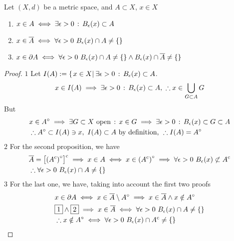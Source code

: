 \documentclass[../complete.tex]{subfiles}
\begin{document}
\begin{prop}
	Let $(X,d)$ be a metric space, and $A\subset X$, $x\in X$
	\begin{enumerate}
	\item $x\in A\iff\exists\epsilon>0\, :\,  B_\epsilon(x)\subset A$
	\item $x\in\cc{A}\iff\forall\epsilon>0\ B_\epsilon(x)\cap A\ne\{\}$
	\item $x\in\partial A\iff\forall\epsilon>0\ B_\epsilon(x)\cap A\ne\{\}\wedge B_\epsilon(x)\cap\overline{A}\ne\{\}$
	\end{enumerate}
\end{prop}
\begin{proof}
		$\boxed{1}$ Let $I(A):=\{\left.x\in X\right|_{}\exists\epsilon>0\, :\,  B_\epsilon(x)\subset A$.\\
		\begin{equation*}
			x\in I(A)\implies\exists\epsilon>0\, :\,  B_\epsilon(x)\subset A,\ \therefore x\in\bigcup_{G\subset A}G
		\end{equation*}
		But
		\begin{equation*}
			\begin{aligned}
				&x\in A^{\circ}\implies\exists G\subset X\text{ open}\, :\,  x\in G\implies\exists\epsilon>0\, :\,  B_\epsilon(x)\subset G\subset A\\
				&\therefore A^{\circ}\subset I(A)\ni x,\ I(A)\subset A\text{ by definition, }\therefore I(A)=A^{\circ}
			\end{aligned}
		\end{equation*}
		$\boxed{2}$ For the second proposition, we have
		\begin{equation*}
			\begin{aligned}
				&\overline{A}=\left[ \left( A^{\mathrm{c}} \right)^{\circ} \right]^{\mathrm{c}}\implies x\in A\iff x\in\left( A^{\mathrm{c}} \right)^{\circ}\implies\forall\epsilon>0\ B_\epsilon(x)\not\subset A^{\mathrm{c}}\\
				&\therefore\forall\epsilon>0\ B_\epsilon(x)\cap A\ne\{\}
			\end{aligned}
		\end{equation*}
		$\boxed{3}$ For the last one, we have, taking into account the first two proofs
		\begin{equation*}
			\begin{aligned}
				&x\in\partial A\iff x\in\cc{A}\setminus\intr{A}\implies x\in\cc{A}\wedge x\notin\intr{A}\\
				&\boxed{1}\wedge\boxed{2}\implies x\in\cc{A}\iff\forall\epsilon>0\ B_\epsilon(x)\cap A\ne\{\}\\
				&\therefore x\notin\intr{A}\iff\forall\epsilon>0\ B_\epsilon(x)\cap\comp{A}\ne\{\}
			\end{aligned}
		\end{equation*}
\end{proof}
\end{document}
